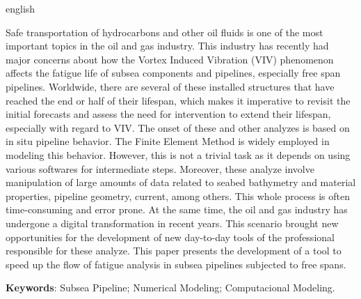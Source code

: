 \begin{resumo}[Abstract]
    \begin{otherlanguage*}{english}
    
        Safe transportation of hydrocarbons and other oil fluids is one of the most important topics in the oil and gas industry.
        This industry has recently had major concerns about how the Vortex Induced Vibration (VIV) phenomenon affects the fatigue life of subsea components and pipelines, especially free span pipelines.
        Worldwide, there are several of these installed structures that have reached the end or half of their lifespan, which makes it imperative to revisit the initial forecasts and assess the need for intervention to extend their lifespan, especially with regard to VIV.
        The onset of these and other analyzes is based on in situ pipeline behavior.
        The Finite Element Method is widely employed in modeling this behavior.
        However, this is not a trivial task as it depends on using various softwares for intermediate steps.
        Moreover, these analyze involve manipulation of large amounts of data related to seabed bathymetry and material properties, pipeline geometry, current, among others.
        This whole process is often time-consuming and error prone.
        At the same time, the oil and gas industry has undergone a digital transformation in recent years.
        This scenario brought new opportunities for the development of new day-to-day tools of the professional responsible for these analyze.
        This paper presents the development of a tool to speed up the flow of fatigue analysis in subsea pipelines subjected to free spans.

    \vspace{\onelineskip}

    \noindent
    \textbf{Keywords}: Subsea Pipeline; Numerical Modeling; Computacional Modeling.
    \end{otherlanguage*}
\end{resumo}